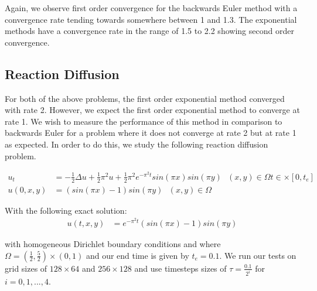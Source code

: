 Again, we observe first order convergence for the backwards Euler method with a convergence rate tending towards somewhere between 1 and 1.3.
The exponential methods have a convergence rate in the range of 1.5 to 2.2 showing second order convergence.

\subsection{Reaction Diffusion}

For both of the above problems, the first order exponential method converged with rate 2.
However, we expect the first order exponential method to converge at rate 1.
We wish to measure the performance of this method in comparison to backwards Euler for a problem where it does not converge at rate 2 but at rate 1 as expected.
In order to do this, we study the following reaction diffusion problem\cite{Huang2022}.

\begin{align*}
    u_t &= -\frac12\Delta u + \frac12 \pi^2u + \frac12 \pi^2 e^{-\pi^2t}sin(\pi x)sin(\pi y) \text{ } (x,y)\in\Omega t\in\times[0,t_e]\\
    u(0,x,y) &= (sin(\pi x) - 1)sin(\pi y) \text{ } (x,y)\in \Omega
\end{align*}

With the following exact solution:
\begin{align*}
    u(t, x, y) &= e^{-\pi^2t}(sin(\pi x) - 1)sin(\pi y)
\end{align*}

with homogeneous Dirichlet boundary conditions and where $\Omega = (\frac12, \frac52)\times(0,1)$ and our end time is given by $t_e = 0.1$.
We run our tests on grid sizes of $128\times64$ and $256\times128$ and use timesteps sizes of $\tau=\frac{0.1}{2^i}$ for $i = 0,1,...,4$.


